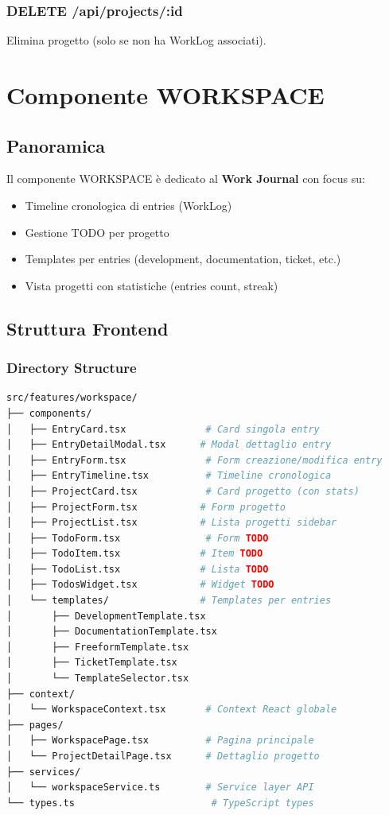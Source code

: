 \documentclass[11pt,a4paper]{article}
\begin{document}
\subsubsection{DELETE /api/projects/:id}

Elimina progetto (solo se non ha WorkLog associati).

\newpage

\section{Componente WORKSPACE}

\subsection{Panoramica}

Il componente WORKSPACE è dedicato al \textbf{Work Journal} con focus su:
\begin{itemize}
    \item Timeline cronologica di entries (WorkLog)
    \item Gestione TODO per progetto
    \item Templates per entries (development, documentation, ticket, etc.)
    \item Vista progetti con statistiche (entries count, streak)
\end{itemize}

\subsection{Struttura Frontend}

\subsubsection{Directory Structure}

\begin{lstlisting}[language=bash]
src/features/workspace/
├── components/
│   ├── EntryCard.tsx              # Card singola entry
│   ├── EntryDetailModal.tsx      # Modal dettaglio entry
│   ├── EntryForm.tsx              # Form creazione/modifica entry
│   ├── EntryTimeline.tsx          # Timeline cronologica
│   ├── ProjectCard.tsx            # Card progetto (con stats)
│   ├── ProjectForm.tsx           # Form progetto
│   ├── ProjectList.tsx           # Lista progetti sidebar
│   ├── TodoForm.tsx               # Form TODO
│   ├── TodoItem.tsx              # Item TODO
│   ├── TodoList.tsx              # Lista TODO
│   ├── TodosWidget.tsx           # Widget TODO
│   └── templates/                # Templates per entries
│       ├── DevelopmentTemplate.tsx
│       ├── DocumentationTemplate.tsx
│       ├── FreeformTemplate.tsx
│       ├── TicketTemplate.tsx
│       └── TemplateSelector.tsx
├── context/
│   └── WorkspaceContext.tsx       # Context React globale
├── pages/
│   ├── WorkspacePage.tsx          # Pagina principale
│   └── ProjectDetailPage.tsx      # Dettaglio progetto
├── services/
│   └── workspaceService.ts        # Service layer API
└── types.ts                        # TypeScript types
\end{lstlisting}
\end{document}
